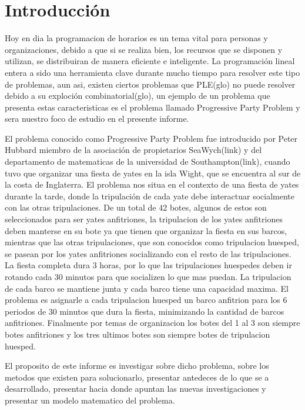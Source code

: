 \documentclass[spanish, fleqn]{article}
\begin{document}
\section{Introducción}

Hoy en dia la programacion de horarios es un tema vital para personas y organizaciones, debido a que si se realiza bien, los recursos que se disponen y utilizan, se distribuiran de manera eficiente e inteligente. La programación lineal entera a sido una herramienta clave durante mucho tiempo para resolver este tipo de problemas, aun asi, existen ciertos problemas que PLE(glo) no puede resolver debido a su exploción combinatorial(glo), un ejemplo de un problema que presenta estas caracteristicas es el problema llamado Progressive Party Problem y sera nuestro foco de estudio en el presente informe.

El problema conocido como Progressive Party Problem fue introducido por Peter Hubbard miembro de la asociación de propietarios SeaWych(link) y del departamento de matematicas de la universidad de Southampton(link), cuando tuvo que organizar una fiesta de yates en la isla Wight, que se encuentra al sur de la costa de Inglaterra. El problema nos situa en el contexto de una fiesta de yates durante la tarde, donde la tripulación de cada yate debe interactuar socialmente con las otras tripulaciones. De un total de 42 botes, algunos de estos son seleccionados para ser yates anfitriones, la tripulacion de los yates anfitriones deben manterse en su bote ya que tienen que organizar la fiesta en sus barcos, mientras que las otras tripulaciones, que son conocidos como tripulacion huesped, se pasean por los yates anfitriones socializando con el resto de las tripulaciones. La fiesta completa dura 3 horas, por lo que las tripulaciones huespedes deben ir rotando cada 30 minutos para que socializen lo que mas puedan. La tripulacion de cada barco se mantiene junta y cada barco tiene una capacidad maxima. El problema es asignarle a cada tripulacion huesped un barco anfitrion para los 6 periodos de 30 minutos que dura la fiesta, minimizando la cantidad de barcos anfitriones. Finalmente por temas de organizacion los botes del 1 al 3 son siempre botes anfitriones y los tres ultimos botes son siempre botes de tripulacion huesped. 

El proposito de este informe es investigar sobre dicho problema, sobre los metodos que existen para solucionarlo, presentar antedeces de lo que se a desarrollado, presentar hacia donde apuntan las nuevas investigaciones y presentar un modelo matematico del problema.
\end{document}

